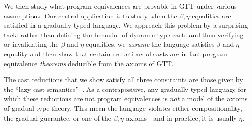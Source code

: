 \documentclass[acmsmall,nonacm]{acmart}
\begin{document}


We then study what program equivalences are provable in GTT under
various assumptions.
%
Our central application is to study when the $\beta, \eta$ equalities
are satisfied in a gradually typed language.
%
%
We approach this problem by a surprising tack: rather than defining the
behavior of dynamic type casts and then verifying or invalidating the
$\beta$ and $\eta$ equalities, we \emph{assume} the language satisfies
$\beta$ and $\eta$ equality and then show that certain reductions of
casts are in fact program equivalence \emph{theorems} deducible from the
axioms of GTT.

The cast reductions that we show satisfy all three constraints are
those given by the ``lazy cast semantics''~\cite{findler-felleisen02,siek+09designspace}.
%
As a contrapositive, any gradually typed language for which these
reductions are not program equivalences is \emph{not} a model of the
axioms of gradual type theory.
%
This mean the language violates either compositionality, the gradual
guarantee, or one of the $\beta, \eta$ axioms---and in practice, it is
usually $\eta$.
\end{document}

